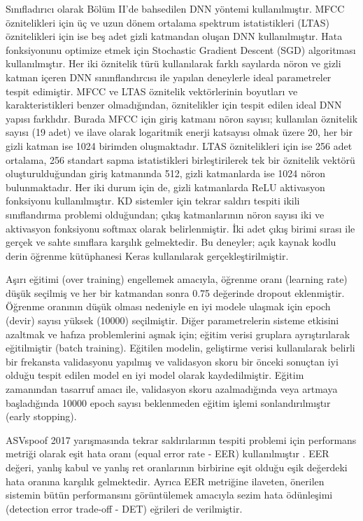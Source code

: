 \documentclass[conference, a4paper]{IEEEtran}
\begin{document}
Sınıfladırıcı olarak Bölüm II'de bahsedilen DNN yöntemi kullanılmıştır. MFCC öznitelikleri için üç ve uzun dönem
ortalama spektrum istatistikleri (LTAS) öznitelikleri için ise beş adet gizli katmandan oluşan DNN kullanılmıştır.
Hata fonksiyonunu optimize etmek için Stochastic Gradient Descent (SGD) algoritması kullanılmıştır. Her iki öznitelik
türü kullanılarak farklı sayılarda nöron ve gizli katman içeren DNN sınınflandırcısı ile yapılan deneylerle ideal
parametreler tespit edimiştir. MFCC ve LTAS öznitelik vektörlerinin boyutları ve karakteristikleri benzer olmadığından,
öznitelikler için tespit edilen ideal DNN yapısı farklıdır. Burada MFCC için giriş katmanı nöron sayısı; kullanılan
öznitelik sayısı (19 adet) ve ilave olarak logaritmik enerji katsayısı olmak üzere 20, her bir gizli katman ise 1024
birimden oluşmaktadır. LTAS öznitelikleri için ise 256 adet ortalama, 256 standart sapma istatistikleri birleştirilerek
tek bir öznitelik vektörü oluşturulduğundan giriş katmanında 512, gizli katmanlarda ise 1024 nöron bulunmaktadır. Her
iki durum için de, gizli katmanlarda ReLU aktivasyon fonksiyonu kullanılmıştır. KD sistemler için tekrar saldırı
tespiti ikili sınıflandırma problemi olduğundan; çıkış katmanlarının nöron sayısı iki ve aktivasyon fonksiyonu softmax
olarak belirlenmiştir. İki adet çıkış birimi sırası ile gerçek ve sahte sınıflara karşılık gelmektedir. Bu deneyler;
açık kaynak kodlu derin öğrenme kütüphanesi Keras\cite{keras} kullanılarak gerçekleştirilmiştir.

Aşırı eğitimi (over training) engellemek amacıyla, öğrenme oranı (learning rate) düşük seçilmiş ve her bir katmandan
sonra 0.75 değerinde dropout\cite{srivastava2014dropout} eklenmiştir. Öğrenme oranının düşük olması nedeniyle en iyi
modele ulaşmak için epoch (devir) sayısı yüksek (10000) seçilmiştir. Diğer parametrelerin sisteme etkisini azaltmak
\cite{li2014efficient} ve hafıza problemlerini aşmak için; eğitim verisi gruplara ayrıştırılarak eğitilmiştir (batch
training). Eğitilen modelin, geliştirme verisi kullanılarak belirli bir frekansta validasyonu yapılmış ve validasyon
skoru bir önceki sonuçtan iyi olduğu tespit edilen model en iyi model olarak kaydedilmiştir. Eğitim zamanından tasarruf
amacı ile, validasyon skoru azalmadığında veya artmaya başladığında 10000 epoch sayısı beklenmeden eğitim işlemi
sonlandırılmıştır (early stopping).

ASVspoof 2017 yarışmasında tekrar saldırılarının tespiti problemi için performans metriği olarak eşit hata oranı
(equal error rate - EER) kullanılmıştır \cite{kinnunen2017asvspoof,kinnunen2017asvspoof1}. EER değeri, yanlış kabul ve
yanlış ret oranlarının birbirine eşit olduğu eşik değerdeki hata oranına karşılık gelmektedir. Ayrıca EER metriğine
ilaveten, önerilen sistemin bütün performansını görüntülemek amacıyla sezim hata ödünleşimi (detection error
trade-off - DET) \cite{martin1997det} eğrileri de verilmiştir.
\end{document}
